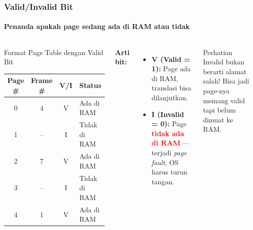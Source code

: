 \documentclass[t,aspectratio=169,xcolor=dvipsnames]{beamer}
\newcommand{\tem}[1]{\textbf{\textcolor{red}{#1}}}
\begin{document}
\begin{frame}
    \frametitle{Valid/Invalid Bit}
    \framesubtitle{Penanda apakah page sedang ada di RAM atau tidak}
    \small

    \begin{columns}[T]
        \begin{block}{Format Page Table dengan Valid Bit}
            \begin{tabular}{|c|c|c|l|}
                \hline
                \textbf{Page \#} & \textbf{Frame \#} & \textbf{V/I} & \textbf{Status} \\
                \hline
                0 & 4  & V & Ada di RAM \\
                \hline
                1 & -- & I & Tidak di RAM \\
                \hline
                2 & 7  & V & Ada di RAM \\
                \hline
                3 & -- & I & Tidak di RAM \\
                \hline
                4 & 1  & V & Ada di RAM \\
                \hline
            \end{tabular}
        \end{block}

        \textbf{Arti bit:}
        \begin{itemize}
            \item \textbf{V (Valid = 1):} Page ada di RAM, translasi bisa dilanjutkan.
            \item \textbf{I (Invalid = 0):} Page \tem{tidak ada di RAM} — terjadi \textit{page fault}, OS harus turun tangan.
        \end{itemize}

        \vspace{0.2cm}
        \begin{alertblock}{Perhatian}
            Invalid bukan berarti alamat salah! Bisa jadi page-nya memang valid tapi belum dimuat ke RAM.
        \end{alertblock}
    \end{columns}
\end{frame}
\end{document}
